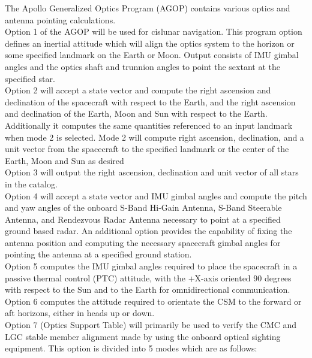 \documentclass[11pt]{article} %
\begin{document}
The Apollo Generalized Optics Program (AGOP) contains various optics and antenna pointing calculations.\\

Option 1 of the AGOP will be used for cislunar navigation. This program option defines an inertial attitude which will align the optics system to the horizon or some specified landmark on the Earth or Moon. Output consists of IMU gimbal angles and the optics shaft and trunnion angles to point the sextant at the specified star.\\

Option 2 will accept a state vector and compute the right ascension and declination of the spacecraft with respect to the Earth, and the right ascension and declination of the Earth, Moon and Sun with respect to the Earth. Additionally it computes the same quantities referenced to an input landmark when mode 2 is selected. Mode 2 will compute right ascension, declination, and a unit vector from the spacecraft to the specified landmark or the center of the Earth, Moon and Sun as desired\\

Option 3 will output the right ascension, declination and unit vector of all stars in the catalog.\\

Option 4 will accept a state vector and IMU gimbal angles and compute the pitch and yaw angles of the onboard S-Band Hi-Gain Antenna, S-Band Steerable Antenna, and Rendezvous Radar Antenna necessary to point at a specified ground based radar. An additional option provides the capability of fixing the antenna position and computing the necessary spacecraft gimbal angles for pointing the antenna at a specified ground station.\\

Option 5 computes the IMU gimbal angles required to place the spacecraft in a passive thermal control (PTC) attitude, with the +X-axis oriented 90 degrees with respect to the Sun and to the Earth for omnidirectional communication.\\

Option 6 computes the attitude required to orientate the CSM to the forward or aft horizons, either in heads up or down.\\

Option 7 (Optics Support Table) will primarily be used to verify the CMC and LGC stable member alignment made by using the onboard optical sighting equipment. This option is divided into 5 modes which are as follows:\\
\end{document}
